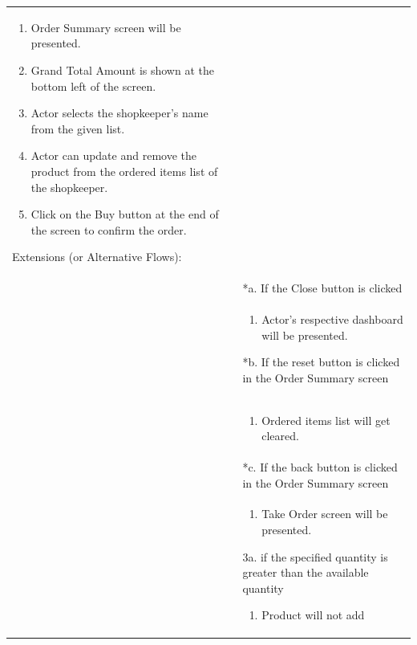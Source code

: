 \documentclass[12pt,a4paper]{article}
\begin{document}
\begin{longtable}{| p{3cm}|p{12cm}|}
\begin{enumerate}
\item Order Summary screen will be presented.
\item Grand Total Amount is shown at the bottom left of the screen.
\item Actor selects the shopkeeper's name from the given list.

\item Actor can update and remove the product from the ordered items list of the shopkeeper.

\item Click on the Buy button at the end of the screen to confirm the order.

\end{enumerate}

Extensions (or Alternative Flows):\\

& *a. If the Close button is clicked \\

& \begin{enumerate}

		\item Actor's respective dashboard will be presented.

	\end{enumerate}

*b. If the reset button is clicked in the Order Summary screen\\

& \begin{enumerate}

		\item Ordered items list will get cleared.

	\end{enumerate}
\\
& *c. If the back button is clicked in the Order Summary screen\\

& \begin{enumerate}

		\item Take Order screen will be presented.

	\end{enumerate}

3a. if the specified quantity is greater than the available quantity

 	\begin{enumerate}

		\item Product will not add


\end{enumerate}
\end{longtable}
\end{document}
